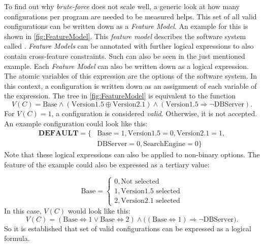 To find out why \textit{brute-force} does not scale well, a generic look at how many configurations per program are needed to be measured helps. This set of all valid configurations can be written down as a \textit{Feature Model}. An example for this is shown in \cref{fig:FeatureModel}. This \textit{feature model} describes the software system called . \textit{Feature Models} can be annotated with further logical expressions to also contain cross-feature constraints. Such can also be seen in the just mentioned example. Each \textit{Feature Model} can also be written down as a logical expression. The atomic variables of this expression are the options of the software system. In this context, a configuration is written down as an assignment of each variable of the expression. The tree in \cref{fig:FeatureModel} is equivalent to the function
\begin{equation*}
	V(C)= \text{Base} \land (\text{Version1.5} \oplus \text{Version2.1}) \land (\text{Version1.5} \Rightarrow \neg \text{DBServer}).%
\end{equation*}
For $V(C)=1$, a configuration is considered \textit{valid}. Otherwise, it is not accepted.
An example configuration could look like this:
\begin{align*}
	\textbf{DEFAULT} =  \{&\text{Base} = 1, \text{Version1.5}=0, \text{Version2.1} = 1, \\
	&\text{DBServer} =0, \text{SearchEngine} =0 \}
\end{align*}
Note that these logical expressions can also be applied to non-binary options. The feature  of the example could also be expressed as a tertiary value:

\begin{equation*}
	\text{Base} =  \begin{cases}
		0, \text{Not selected}\\
		1, \text{Version1.5 selected}\\
		2, \text{Version2.1 selected}
	\end{cases}
\end{equation*}
In this case, $V(C)$ would look like this:
\begin{equation*}
		V(C)= (\text{Base} \Leftrightarrow 1 \lor \text{Base} \Leftrightarrow 2) \land \big((\text{Base} \Leftrightarrow 1) \Rightarrow \neg \text{DBServer}\big).
\end{equation*}
So it is established that set of valid configurations can be expressed as a logical formula.

